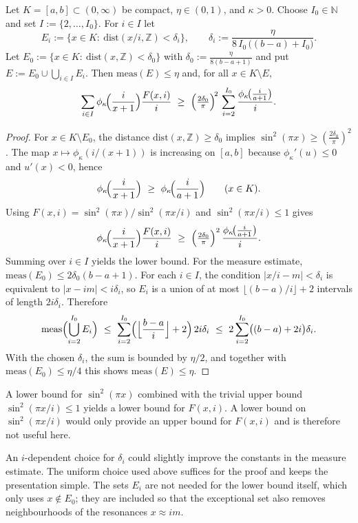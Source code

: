 \begin{lemma}\label{lem:constructive-lb}
Let $K=[a,b]\subset(0,\infty)$ be compact, $\eta\in(0,1)$, and $\kappa>0$. Choose $I_0\in\mathbb N$ and set $I:=\{2,\dots,I_0\}$. For $i\in I$ let
\[
E_i:=\{x\in K:\ \mathrm{dist}(x/i,\mathbb Z)<\delta_i\},\qquad 
\delta_i:=\frac{\eta}{8\,I_0\,\bigl((b-a)+I_0\bigr)}.
\]
Let $E_0:=\{x\in K:\ \mathrm{dist}(x,\mathbb Z)<\delta_0\}$ with $\delta_0:=\frac{\eta}{8(b-a+1)}$ and put $E:=E_0\cup\bigcup_{i\in I}E_i$. Then $\mathrm{meas}(E)\le \eta$ and, for all $x\in K\setminus E$,
\[
\sum_{i\in I}\phi_{\kappa}\!\Bigl(\frac{i}{x+1}\Bigr)\frac{F(x,i)}{i}
\ \ge\ 
\Bigl(\tfrac{2\delta_0}{\pi}\Bigr)^{\!2}\,
\sum_{i=2}^{I_0}\frac{\phi_{\kappa}\!\bigl(\tfrac{i}{a+1}\bigr)}{i}.
\]

\begin{proof}
For $x\in K\setminus E_0$, the distance $\mathrm{dist}(x,\mathbb Z)\ge \delta_0$ implies $\sin^2(\pi x)\ge (\tfrac{2\delta_0}{\pi})^2$. The map $x\mapsto \phi_\kappa(i/(x+1))$ is increasing on $[a,b]$ because $\phi_\kappa'(u)\le 0$ and $u'(x)<0$, hence
\[
\phi_\kappa\!\Bigl(\frac{i}{x+1}\Bigr)\ \ge\ \phi_\kappa\!\Bigl(\frac{i}{a+1}\Bigr)\qquad(x\in K).
\]
Using $F(x,i)=\sin^2(\pi x)/\sin^2(\pi x/i)$ and $\sin^2(\pi x/i)\le 1$ gives
\[
\phi_\kappa\!\Bigl(\frac{i}{x+1}\Bigr)\frac{F(x,i)}{i}
\ \ge\
\Bigl(\tfrac{2\delta_0}{\pi}\Bigr)^2\,\frac{\phi_\kappa\!\bigl(\tfrac{i}{a+1}\bigr)}{i}.
\]
Summing over $i\in I$ yields the lower bound. For the measure estimate, $\mathrm{meas}(E_0)\le 2\delta_0(b-a+1)$. For each $i\in I$, the condition $|x/i-m|<\delta_i$ is equivalent to $|x-im|<i\delta_i$, so $E_i$ is a union of at most $\lfloor(b-a)/i\rfloor+2$ intervals of length $2i\delta_i$. Therefore
\[
\mathrm{meas}\Bigl(\bigcup_{i=2}^{I_0}E_i\Bigr)\ \le\ \sum_{i=2}^{I_0}\Bigl(\Bigl\lfloor\frac{b-a}{i}\Bigr\rfloor+2\Bigr)\,2i\delta_i
\ \le\ 2\sum_{i=2}^{I_0}\bigl((b-a)+2i\bigr)\delta_i.
\]
With the chosen $\delta_i$, the sum is bounded by $\eta/2$, and together with $\mathrm{meas}(E_0)\le \eta/4$ this shows $\mathrm{meas}(E)\le \eta$.
\end{proof}
\end{lemma}

\begin{remark}
A lower bound for $\sin^2(\pi x)$ combined with the trivial upper bound $\sin^2(\pi x/i)\le 1$ yields a lower bound for $F(x,i)$. A lower bound on $\sin^2(\pi x/i)$ would only provide an upper bound for $F(x,i)$ and is therefore not useful here.
\end{remark}
\begin{remark}[On the choice of the thresholds $\delta_i$]
An $i$-dependent choice for $\delta_i$ could slightly improve the constants in the measure estimate. The uniform choice used above suffices for the proof and keeps the presentation simple. The sets $E_i$ are not needed for the lower bound itself, which only uses $x\notin E_0$; they are included so that the exceptional set also removes neighbourhoods of the resonances $x\approx im$.
\end{remark}

